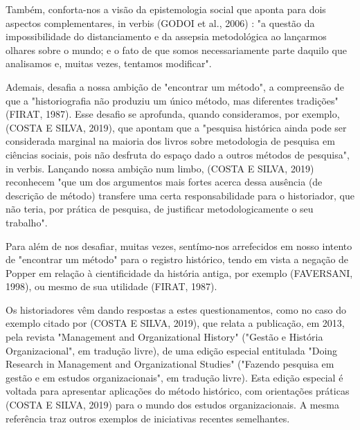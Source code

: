 \noindent\begin{flushright}\mbox{\linespread{1}\selectfont\centering{}}\end{flushright}


Também, conforta-nos a visão da epistemologia social que aponta para dois aspectos complementares, in verbis (GODOI et al., 2006) : "a questão da impossibilidade do distanciamento e da assepsia metodológica ao lançarmos olhares sobre o mundo; e o fato de que somos necessariamente parte daquilo que analisamos e, muitas vezes, tentamos modificar".

Ademais, desafia a nossa ambição de "encontrar um método", a compreensão de que a "historiografia não produziu um único método, mas diferentes tradições" (FIRAT, 1987).  Esse desafio se aprofunda, quando consideramos, por exemplo, (COSTA E SILVA, 2019), que apontam que a "pesquisa histórica ainda pode ser considerada marginal na maioria dos livros sobre metodologia de pesquisa em ciências sociais, pois não desfruta do espaço dado a outros métodos de pesquisa", in verbis. Lançando nossa ambição num limbo,  (COSTA E SILVA, 2019) reconhecem "que um dos argumentos mais fortes acerca dessa ausência (de descrição de método) transfere uma certa responsabilidade para o historiador, que não teria, por prática de pesquisa, de justificar metodologicamente o seu trabalho".

Para além de nos desafiar, muitas vezes, sentímo-nos arrefecidos em nosso intento de "encontrar um método" para o registro histórico, tendo em vista a negação de Popper em relação à cientificidade da história antiga, por exemplo (FAVERSANI, 1998), ou mesmo de sua utilidade (FIRAT, 1987).

Os historiadores vêm dando respostas a estes questionamentos, como no caso do exemplo citado por  (COSTA E SILVA, 2019), que relata a publicação, em 2013, pela revista "Management and Organizational History" ("Gestão e História Organizacional", em tradução livre), de uma edição especial entitulada "Doing Research in Management and Organizational Studies" ("Fazendo pesquisa em gestão e em estudos organizacionais", em tradução livre). Esta edição especial é voltada para apresentar aplicações do método histórico, com orientações práticas (COSTA E SILVA, 2019) para o mundo dos estudos organizacionais. A mesma referência traz outros exemplos de iniciativas recentes semelhantes.


